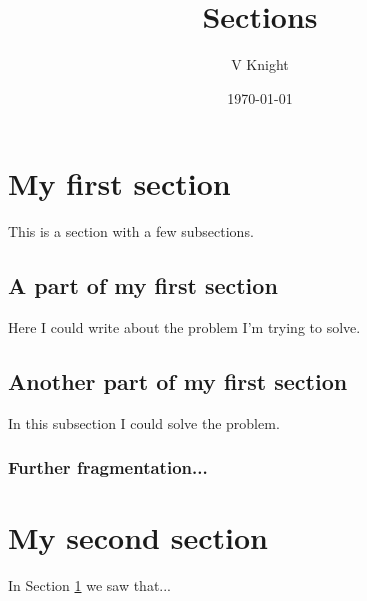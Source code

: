\documentclass{article}
\title{Sections}
\author{V Knight}
\date{\today}
\begin{document}
\maketitle

\section{My first section}\label{first_section}

This is a section with a few subsections.

    \subsection{A part of my first section}

    Here I could write about the problem I'm trying to solve.

    \subsection{Another part of my first section}

    In this subsection I could solve the problem.

        \subsubsection{Further fragmentation...}

\section{My second section}\label{second_section}

In Section \ref{first_section} we saw that...
\end{document}
